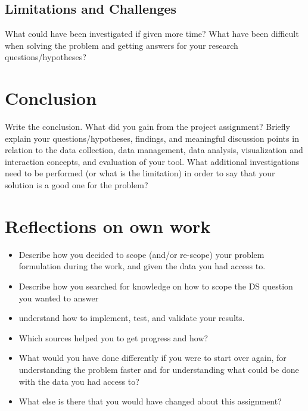 \subsection{Limitations and Challenges}
\label{sec:limitation}
What could have been investigated if given more time? What have been difficult when solving the problem and getting answers for your research questions/hypotheses?

\section{Conclusion}
\label{chap:conclusion}
Write the conclusion. What did you gain from the project assignment? Briefly explain your questions/hypotheses, findings, and meaningful discussion points in relation to the data collection, data management, data analysis, visualization and interaction concepts, and evaluation of your tool.
What additional investigations need to be performed (or what is the limitation) in order to say that your solution is a good one for the problem? 

\section{Reflections on own work}
\label{chap:reflection}
\begin{itemize}
    \item Describe how you decided to scope (and/or re-scope) your problem formulation during the work, and given the data you had access to.
    \item Describe how you searched for knowledge on how to scope the DS question you wanted to answer 
    \item understand how to implement, test, and validate your results. 
    \item Which sources helped you to get progress and how?
    \item What would you have done differently if you were to start over again, for understanding the problem faster and for understanding what could be done with the data you had access to?
    \item What else is there that you would have changed about this assignment?
\end{itemize}

\newpage